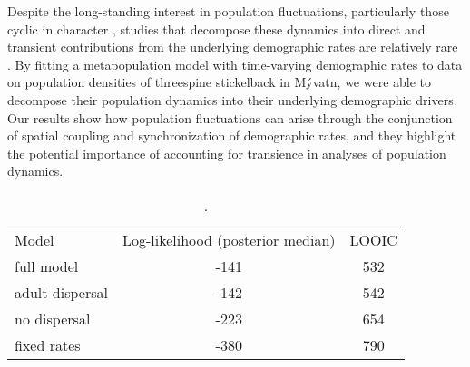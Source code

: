 \documentclass[11pt]{article}
\begin{document}
Despite the long-standing interest in population fluctuations,
particularly those cyclic in character 
\citep{elton1924, nicholson1935},
studies that decompose these dynamics into direct and transient contributions 
from the underlying demographic rates are relatively rare 
\citep{fox2000population, koons2017understanding, hoy2020fluctuations}.
By fitting a metapopulation model with time-varying demographic rates to 
data on population densities of threespine stickelback in M\'{y}vatn,
we were able to decompose their population dynamics into their 
underlying demographic drivers.
Our results show how population fluctuations can arise through the conjunction of 
spatial coupling and synchronization of demographic rates, 
and they highlight the potential importance 
of accounting for transience in analyses of population dynamics.







\clearpage



\clearpage
\begin{table}
\caption{\label{tab:compare}
.
}
\setlength{\tabcolsep}{12pt}
\begin{tabular}{lcc}
\toprule
Model                  &    Log-likelihood (posterior median) & LOOIC \\
\cmidrule{1-3}
full model             & -141 & 532 \\
adult dispersal        & -142 & 542 \\
no dispersal           & -223 & 654 \\
fixed rates            & -380 & 790 \\
\bottomrule
\end{tabular}
\end{table}
\clearpage
\end{document}
